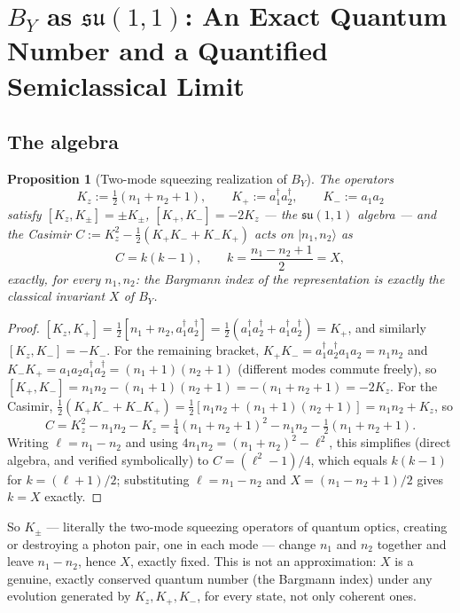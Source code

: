 \documentclass[11pt]{amsart}
\newtheorem{proposition}[theorem]{Proposition}
\theoremstyle{remark}
\begin{document}
\section{$B_Y$ as $\mathfrak{su}(1,1)$: An Exact Quantum Number and a Quantified Semiclassical Limit}

\subsection{The algebra}

\begin{proposition}[Two-mode squeezing realization of $B_Y$]\label{prop:su11}
The operators
\[
K_z:=\tfrac12(n_1+n_2+1),\qquad K_+:=a_1^\dagger a_2^\dagger,\qquad K_-:=a_1a_2
\]
satisfy $[K_z,K_\pm]=\pm K_\pm$, $[K_+,K_-]=-2K_z$ --- the $\mathfrak{su}(1,1)$ algebra --- and the Casimir $C:=K_z^2-\tfrac12(K_+K_-+K_-K_+)$ acts on $|n_1,n_2\rangle$ as
\begin{equation}
C=k(k-1),\qquad k=\frac{n_1-n_2+1}2=X, \tag{4.1}
\end{equation}
exactly, for every $n_1,n_2$: the Bargmann index of the representation is exactly the classical invariant $X$ of $B_Y$.
\end{proposition}

\begin{proof}
$[K_z,K_+]=\tfrac12[n_1+n_2,a_1^\dagger a_2^\dagger]=\tfrac12(a_1^\dagger a_2^\dagger+a_1^\dagger a_2^\dagger)=K_+$, and similarly $[K_z,K_-]=-K_-$. For the remaining bracket, $K_+K_-=a_1^\dagger a_2^\dagger a_1a_2=n_1n_2$ and $K_-K_+=a_1a_2a_1^\dagger a_2^\dagger=(n_1+1)(n_2+1)$ (different modes commute freely), so $[K_+,K_-]=n_1n_2-(n_1+1)(n_2+1)=-(n_1+n_2+1)=-2K_z$. For the Casimir, $\tfrac12(K_+K_-+K_-K_+)=\tfrac12[n_1n_2+(n_1+1)(n_2+1)]=n_1n_2+K_z$, so
\[
C=K_z^2-n_1n_2-K_z=\tfrac14(n_1+n_2+1)^2-n_1n_2-\tfrac12(n_1+n_2+1).
\]
Writing $\ell=n_1-n_2$ and using $4n_1n_2=(n_1+n_2)^2-\ell^2$, this simplifies (direct algebra, and verified symbolically) to $C=(\ell^2-1)/4$, which equals $k(k-1)$ for $k=(\ell+1)/2$; substituting $\ell=n_1-n_2$ and $X=(n_1-n_2+1)/2$ gives $k=X$ exactly.
\end{proof}

So $K_\pm$ --- literally the two-mode squeezing operators of quantum optics, creating or destroying a photon pair, one in each mode --- change $n_1$ and $n_2$ together and leave $n_1-n_2$, hence $X$, exactly fixed. This is not an approximation: $X$ is a genuine, exactly conserved quantum number (the Bargmann index) under any evolution generated by $K_z,K_+,K_-$, for every state, not only coherent ones.
\end{document}
